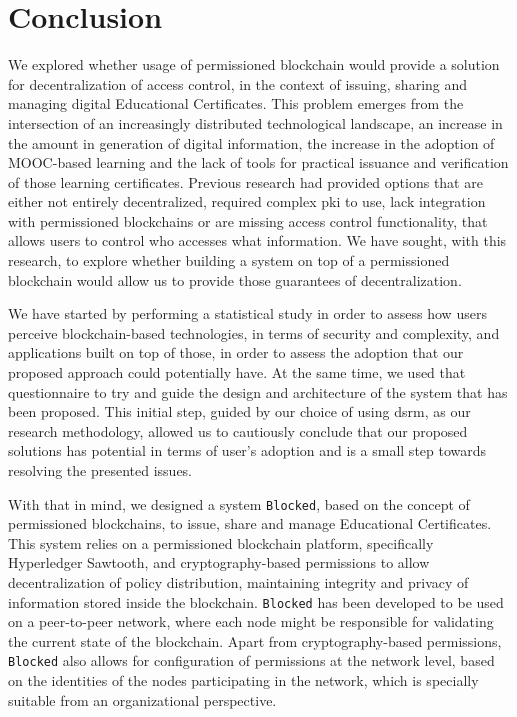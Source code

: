 \chapter{Conclusion}
\label{chap:conclusion}

We explored whether usage of permissioned blockchain would provide a solution for decentralization of access control, in the context of issuing, sharing and managing digital Educational Certificates. This problem emerges from the intersection of an increasingly distributed technological landscape, an increase in the amount in generation of digital information, the increase in the adoption of MOOC-based learning and the lack of tools for practical issuance and verification of those learning certificates. Previous research had provided options that are either not entirely decentralized, required complex \gls{pki} to use, lack integration with permissioned blockchains or are missing access control functionality, that allows users to control who accesses what information. We have sought, with this research, to explore whether building a system on top of a permissioned blockchain would allow us to provide those guarantees of decentralization.

We have started by performing a statistical study in order to assess how users perceive blockchain-based technologies, in terms of security and complexity, and applications built on top of those, in order to assess the adoption that our proposed approach could potentially have. At the same time, we used that questionnaire to try and guide the design and architecture of the system that has been proposed. This initial step, guided by our choice of using \gls{dsrm}, as our research methodology, allowed us to cautiously conclude that our proposed solutions has potential in terms of user's adoption and is a small step towards resolving the presented issues.

With that in mind, we designed a system \texttt{Blocked}, based on the concept of permissioned blockchains, to issue, share and manage Educational Certificates. This system relies on a permissioned blockchain platform, specifically Hyperledger Sawtooth, and cryptography-based permissions to allow decentralization of policy distribution, maintaining integrity and privacy of information stored inside the blockchain. \texttt{Blocked} has been developed to be used on a peer-to-peer network, where each node might be responsible for validating the current state of the blockchain. Apart from cryptography-based permissions, \texttt{Blocked} also allows for configuration of permissions at the network level, based on the identities of the nodes participating in the network, which is specially suitable from an organizational perspective.

